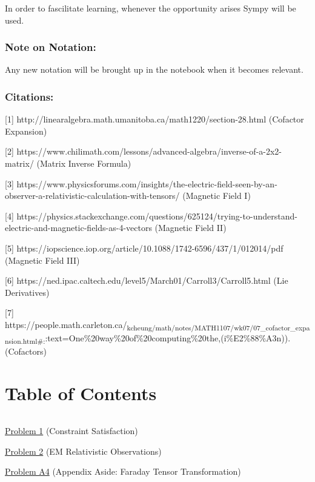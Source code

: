 \documentclass[landscape,letterpaper,10pt,english]{article}
\begin{document}
In order to fascilitate learning, whenever the opportunity arises Sympy
will be used.

\hypertarget{note-on-notation}{%
\subsubsection{Note on Notation:}\label{note-on-notation}}

Any new notation will be brought up in the notebook when it becomes
relevant.

\hypertarget{citations}{%
\subsubsection{Citations:}\label{citations}}

{[}1{]} http://linearalgebra.math.umanitoba.ca/math1220/section-28.html
(Cofactor Expansion)

{[}2{]}
https://www.chilimath.com/lessons/advanced-algebra/inverse-of-a-2x2-matrix/
(Matrix Inverse Formula)

{[}3{]}
https://www.physicsforums.com/insights/the-electric-field-seen-by-an-observer-a-relativistic-calculation-with-tensors/
(Magnetic Field I)

{[}4{]}
https://physics.stackexchange.com/questions/625124/trying-to-understand-electric-and-magnetic-fields-as-4-vectors
(Magnetic Field II)

{[}5{]}
https://iopscience.iop.org/article/10.1088/1742-6596/437/1/012014/pdf
(Magnetic Field III)

{[}6{]}
https://ned.ipac.caltech.edu/level5/March01/Carroll3/Carroll5.html (Lie
Derivatives)

{[}7{]}
https://people.math.carleton.ca/\textsubscript{kcheung/math/notes/MATH1107/wk07/07\_cofactor\_expansion.html\#:}:text=One\%20way\%20of\%20computing\%20the,(i\%E2\%88\%A3n)).
(Cofactors)

    \hypertarget{table-of-contents}{%
\section{Table of Contents}\label{table-of-contents}}

\[\label{toc}\]

\hyperref[p1]{Problem 1} (Constraint Satisfaction)

\hyperref[p2]{Problem 2} (EM Relativistic Observations)

\hyperref[a4]{Problem A4} (Appendix Aside: Faraday Tensor
Transformation)
\end{document}

